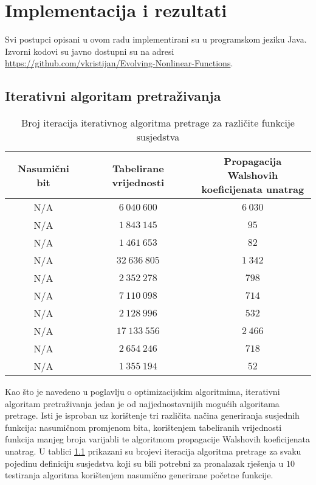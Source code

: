 \chapter{Implementacija i rezultati}

Svi postupci opisani u ovom radu implementirani su u programskom jeziku Java.
Izvorni kodovi su javno dostupni su na adresi \href{https://github.com/vkristijan/Evolving-Nonlinear-Functions}{https://github.com/vkristijan/Evolving-Nonlinear-Functions}.

\section{Iterativni algoritam pretraživanja}
\begin{table}[]
    \centering
    \begin{tabular}{ccc}
        Nasumični bit & Tabelirane vrijednosti & \makecell{Propagacija Walshovih \\ koeficijenata unatrag} \\ \hline
        N/A &  $6\:040\:600$ & $6\:030$ \\
        N/A &  $1\:843\:145$ &     $95$ \\
        N/A &  $1\:461\:653$ &     $82$ \\
        N/A & $32\:636\:805$ & $1\:342$ \\
        N/A &  $2\:352\:278$ &    $798$ \\
        N/A &  $7\:110\:098$ &    $714$ \\
        N/A &  $2\:128\:996$ &    $532$ \\
        N/A & $17\:133\:556$ & $2\:466$ \\
        N/A &  $2\:654\:246$ &    $718$ \\
        N/A &  $1\:355\:194$ &     $52$
    \end{tabular}
    \captionsetup{justification=centering}
    \caption{Broj iteracija iterativnog algoritma pretrage za različite funkcije susjedstva}
    \label{tbl:iterative_6}
\end{table}

Kao što je navedeno u poglavlju o optimizacijskim algoritmima, iterativni algoritam pretraživanja jedan je od najjednostavnijih mogućih algoritama pretrage. 
Isti je isproban uz korištenje tri različita načina generiranja susjednih funkcija: nasumičnom promjenom bita, korištenjem tabeliranih vrijednosti funkcija manjeg broja varijabli te algoritmom propagacije Walshovih koeficijenata unatrag.
U tablici \ref{tbl:iterative_6} prikazani su brojevi iteracija algoritma pretrage za svaku pojedinu definiciju susjedstva koji su bili potrebni za pronalazak rješenja u $10$ testiranja algoritma korištenjem nasumično generirane početne funkcije.

